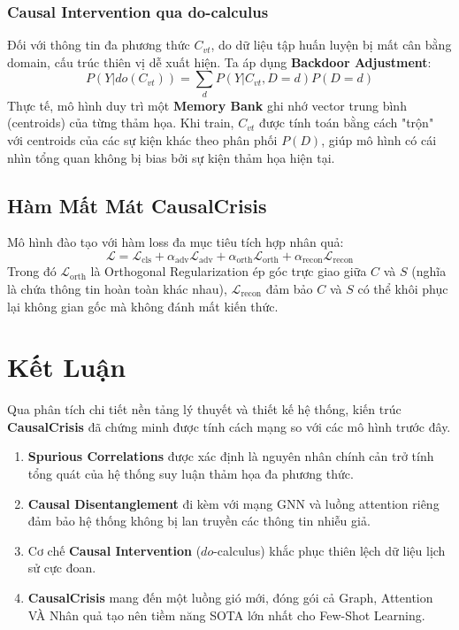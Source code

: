 \documentclass[12pt,a4paper]{article}
\begin{document}
\subsubsection{Causal Intervention qua do-calculus}
Đối với thông tin đa phương thức $C_{vt}$, do dữ liệu tập huấn luyện bị mất cân bằng domain, cấu trúc thiên vị dễ xuất hiện. Ta áp dụng \textbf{Backdoor Adjustment}:
\begin{equation}
P(Y | do(C_{vt})) = \sum_{d} P(Y | C_{vt}, D=d) P(D=d)
\end{equation}
Thực tế, mô hình duy trì một \textbf{Memory Bank} ghi nhớ vector trung bình (centroids) của từng thảm họa. Khi train, $C_{vt}$ được tính toán bằng cách "trộn" với centroids của các sự kiện khác theo phân phối $P(D)$, giúp mô hình có cái nhìn tổng quan không bị bias bởi sự kiện thảm họa hiện tại.

\subsection{Hàm Mất Mát CausalCrisis}
Mô hình đào tạo với hàm loss đa mục tiêu tích hợp nhân quả:
\begin{equation}
\mathcal{L} = \mathcal{L}_{\text{cls}} + \alpha_{\text{adv}} \mathcal{L}_{\text{adv}} + \alpha_{\text{orth}} \mathcal{L}_{\text{orth}} + \alpha_{\text{recon}} \mathcal{L}_{\text{recon}}
\end{equation}
Trong đó $\mathcal{L}_{\text{orth}}$ là Orthogonal Regularization ép góc trực giao giữa $C$ và $S$ (nghĩa là chứa thông tin hoàn toàn khác nhau), $\mathcal{L}_{\text{recon}}$ đảm bảo $C$ và $S$ có thể khôi phục lại không gian gốc mà không đánh mất kiến thức.

\section{Kết Luận}

Qua phân tích chi tiết nền tảng lý thuyết và thiết kế hệ thống, kiến trúc \textbf{CausalCrisis} đã chứng minh được tính cách mạng so với các mô hình trước đây.

\begin{insightbox}
\begin{enumerate}[leftmargin=*]
  \item \textbf{Spurious Correlations} được xác định là nguyên nhân chính cản trở tính tổng quát của hệ thống suy luận thảm họa đa phương thức.
  \item \textbf{Causal Disentanglement} đi kèm với mạng GNN và luồng attention riêng đảm bảo hệ thống không bị lan truyền các thông tin nhiễu giả.
  \item Cơ chế \textbf{Causal Intervention} ($do$-calculus) khắc phục thiên lệch dữ liệu lịch sử cực đoan.
  \item \textbf{CausalCrisis} mang đến một luồng gió mới, đóng gói cả Graph, Attention VÀ Nhân quả tạo nên tiềm năng SOTA lớn nhất cho Few-Shot Learning.
\end{enumerate}
\end{insightbox}
\end{document}
